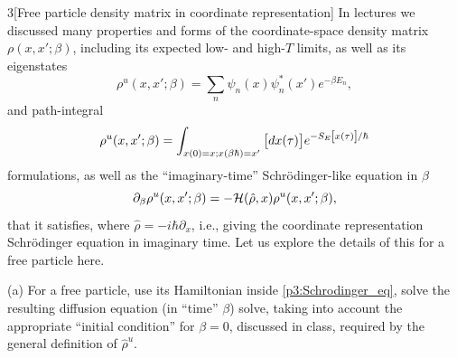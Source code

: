 \documentclass[12pt]{article}
\begin{document}
\begin{problem}{3}[Free particle density matrix in coordinate representation]
In lectures we discussed many properties and forms of the coordinate-space
density matrix $\rho(x,x';\beta)$, including its expected low- and high-$T$
limits, as well as its eigenstates
\begin{equation}\label{p3:H_basis}
    \rho^u(x,x';\beta)=\sum_n\psi_n(x)\psi_n^\ast(x')e^{-\beta E_n},
\end{equation}
and path-integral
\begin{equation}\label{p3:path_int}
    \rho^u(x,x';\beta)=\int_{x(0)=x;x(\beta\hbar)=x'}\qty[dx(\tau)]
    e^{-S_E\qty[x(\tau)]/\hbar}
\end{equation}
formulations, as well as the ``imaginary-time'' Schr\"{o}dinger-like equation in
$\beta$
\begin{equation}\label{p3:Schrodinger_eq}
    \partial_\beta\rho^u(x,x';\beta)=-\mathcal{H}\qty(\hat\rho,x)\rho^u(x,x';\beta), 
\end{equation}
that it satisfies, where $\hat\rho=-i\hbar\partial_x$, i.e., giving the
coordinate representation Schr\"{o}dinger equation in imaginary time. Let us
explore the details of this for a free particle here.

(a) For a free particle, use its Hamiltonian inside \eqref{p3:Schrodinger_eq},
solve the resulting diffusion equation (in ``time'' $\beta$) solve, taking into
account the appropriate ``initial condition''  for $\beta=0$, discussed in
class, required by the general definition of $\hat\rho^u$.


\end{problem}
\end{document}
